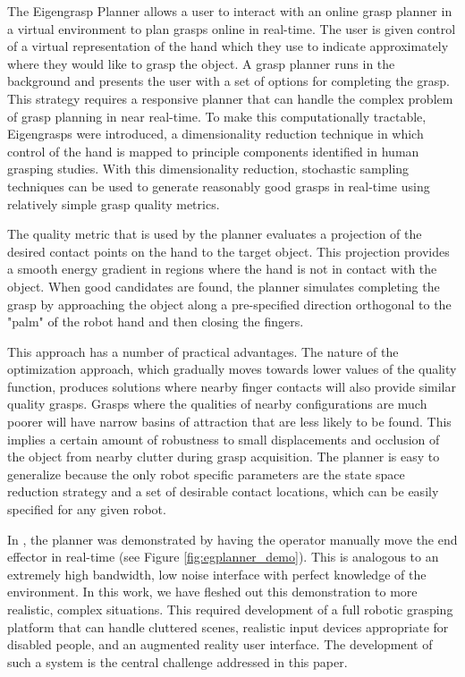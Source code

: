 The Eigengrasp Planner allows a user to interact with an online grasp planner in a virtual environment to plan grasps online in real-time. The user is given control of a virtual representation of the hand which they use to indicate approximately where they would like to grasp the object. A grasp planner runs in the background and presents the user with a set of options for completing the grasp. 
This strategy requires a responsive planner that can handle the complex problem of grasp planning in near real-time. To make this computationally tractable, Eigengrasps were introduced, a dimensionality reduction technique in which control of the hand is mapped to principle components identified in human grasping studies. With this dimensionality reduction, stochastic sampling techniques can be used to generate reasonably good grasps in real-time using relatively simple grasp quality metrics.
 
The quality metric that is used by the planner evaluates a projection of the desired contact points on the hand to the target object. This projection provides a smooth energy gradient in regions where the hand is not in contact with the object. When good candidates are found, the planner simulates completing the grasp by approaching the object along a pre-specified direction orthogonal to the "palm" of the robot hand and then closing the fingers. 

This approach has a number of practical advantages. The nature of the optimization approach, which gradually moves towards lower values of the quality function, produces solutions where nearby finger contacts will also provide similar quality grasps. Grasps where the qualities of nearby configurations are much poorer will have narrow basins of attraction that are less likely to be found. This implies a certain amount of robustness to small displacements and occlusion of the object from nearby clutter during grasp acquisition. The planner is easy to generalize because the only robot specific parameters are the state space reduction strategy and a set of desirable contact locations, which can be easily specified for any given robot. 

In \cite{CiocarlieIJRR}, the planner was demonstrated by having the operator manually move the end effector in real-time (see Figure \ref{fig:egplanner_demo}). This is analogous to an extremely high bandwidth, low noise interface with perfect knowledge of the environment. In this work, we have fleshed out this demonstration to more realistic, complex situations. This required development of a full robotic grasping platform that can handle cluttered scenes, realistic input devices appropriate for disabled people, and an augmented reality user interface. The development of such a system is the central challenge addressed in this paper.  


